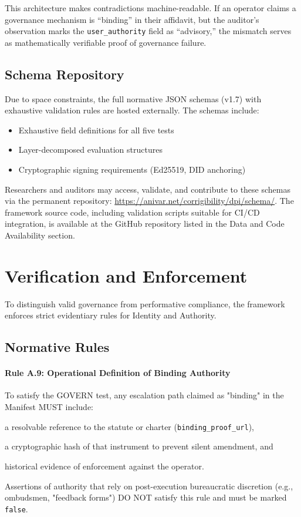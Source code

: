 \documentclass{article}
\begin{document}
This architecture makes contradictions machine-readable. If an operator claims a governance mechanism is ``binding'' in their affidavit, but the auditor's observation marks the \texttt{user\_authority} field as ``advisory,'' the mismatch serves as mathematically verifiable proof of governance failure.

\subsection{Schema Repository}

Due to space constraints, the full normative JSON schemas (v1.7) with exhaustive validation rules are hosted externally. The schemas include:

\begin{itemize}[noitemsep]
    \item Exhaustive field definitions for all five tests
    \item Layer-decomposed evaluation structures
    \item Cryptographic signing requirements (Ed25519, DID anchoring)
\end{itemize}

Researchers and auditors may access, validate, and contribute to these schemas via the permanent repository: \url{https://anivar.net/corrigibility/dpi/schema/}. The framework source code, including validation scripts suitable for CI/CD integration, is available at the GitHub repository listed in the Data and Code Availability section.

\section{Verification and Enforcement}
\label{appendix:rules}

To distinguish valid governance from performative compliance, the framework enforces strict evidentiary rules for Identity and Authority.

\subsection{Normative Rules}

\paragraph{Rule A.9: Operational Definition of Binding Authority}
To satisfy the GOVERN test, any escalation path claimed as "binding" in the Manifest MUST include:
\begin{enumerate*}[label=(\roman*)]
    \item a resolvable reference to the statute or charter (\texttt{binding\_proof\_url}),
    \item a cryptographic hash of that instrument to prevent silent amendment, and
    \item historical evidence of enforcement against the operator.
\end{enumerate*}
Assertions of authority that rely on post-execution bureaucratic discretion (e.g., ombudsmen, "feedback forms") DO NOT satisfy this rule and must be marked \texttt{false}.
\end{document}
